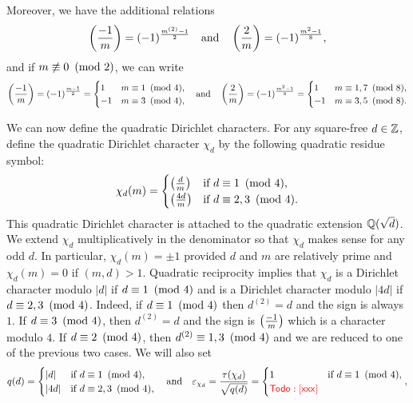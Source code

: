 \documentclass[12pt,reqno,oneside]{amsart}
\begin{document}
    Moreover, we have the additional relations
    \[
        \left(\frac{-1}{m}\right) = (-1)^{\frac{m^{(2)}-1}{2}} \quad \text{and} \quad \left(\frac{2}{m}\right) = (-1)^{\frac{m^{2}-1}{8}},
    \]
    and if $m \not\equiv 0 \ \left(\text{mod }2\right)$, we can write
    \[
        \left(\frac{-1}{m}\right) = (-1)^{\frac{m-1}{2}} = \begin{cases} 1 & \text{$m \equiv 1 \ \left(\text{mod }4\right)$}, \\ -1 & \text{$m \equiv 3 \ \left(\text{mod }4\right)$}, \end{cases} \quad \text{and} \quad \left(\frac{2}{m}\right) = (-1)^{\frac{m^{2}-1}{8}} = \begin{cases} 1 & \text{$m \equiv 1,7 \ \left(\text{mod }8\right)$}, \\ -1 & \text{$m \equiv 3,5 \ \left(\text{mod }8\right)$}. \end{cases}
    \]

    We can now define the quadratic Dirichlet characters. For any square-free $d \in \mathbb{Z}$, define the quadratic Dirichlet character $\chi_{d}$ by the following quadratic residue symbol:
    \[
        \chi_{d}(m) = \begin{cases} \left(\frac{d}{m}\right) & \text{if $d \equiv 1 \ \left(\text{mod }4\right)$}, \\ \left(\frac{4d}{m}\right) & \text{if $d \equiv 2,3 \ \left(\text{mod }4\right)$}. \end{cases}
    \]
    This quadratic Dirichlet character is attached to the quadratic extension $\mathbb{Q}(\sqrt{d})$. We extend $\chi_{d}$ multiplicatively in the denominator so that $\chi_{d}$ makes sense for any odd $d$. In particular, $\chi_{d}(m) = \pm1$ provided $d$ and $m$ are relatively prime and $\chi_{d}(m) = 0$ if $(m,d) > 1$. Quadratic reciprocity implies that $\chi_{d}$ is a Dirichlet character modulo $|d|$ if $d \equiv 1 \ \left(\text{mod }4\right)$ and is a Dirichlet character modulo $|4d|$ if $d \equiv 2,3 \ \left(\text{mod }4\right)$. Indeed, if $d \equiv 1 \ \left(\text{mod }4\right)$ then $d^{(2)} = d$ and the sign is always $1$. If $d \equiv 3 \ \left(\text{mod }4\right)$, then $d^{(2)} = d$ and the sign is $\textstyle{\left(\frac{-1}{m}\right)}$ which is a character modulo $4$. If $d \equiv 2 \ \left(\text{mod }4\right)$, then $d^{(2)} \equiv 1,3 \ \left(\text{mod }4\right)$ and we are reduced to one of the previous two cases. We will also set
    \[
        q(d) = \begin{cases} |d| & \text{if $d \equiv 1 \ \left(\text{mod }4\right)$}, \\ |4d| & \text{if $d \equiv 2,3 \ \left(\text{mod }4\right)$}, \end{cases} \quad \text{and} \quad \varepsilon_{\chi_{d}} = \frac{\tau(\chi_{d})}{\sqrt{q(d)}} = \begin{cases} 1 & \text{if $d \equiv 1 \ \left(\text{mod }4\right)$}, \\ \textcolor{red}{\sf Todo: [xxx]} \end{cases},
    \]
\end{document}
